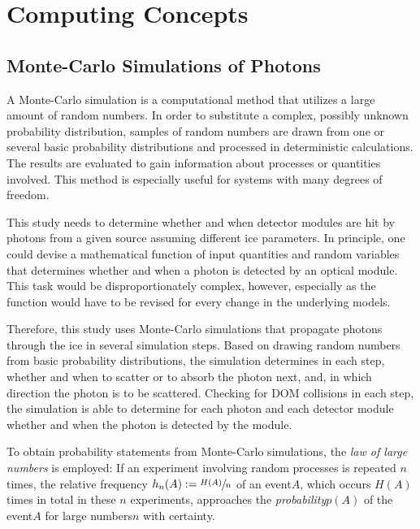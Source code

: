 \section{Computing Concepts}
\label{sec:simulation_background}

\subsection{Monte-Carlo Simulations of Photons}
\label{sec:monte_carlo}

A Monte-Carlo simulation is a computational method that utilizes a large
amount of random numbers. In order to substitute a complex, possibly
unknown probability distribution, samples of random numbers are drawn
from one or several basic probability distributions and processed in
deterministic calculations. The results are evaluated to gain
information about processes or quantities involved. This method is
especially useful for systems with many degrees of freedom.
\cite{physiklexikon}

This study needs to determine whether and when detector modules are hit
by photons from a given source assuming different ice parameters. In
principle, one could devise a mathematical function of input quantities
and random variables that determines whether and when a photon is
detected by an optical module. This task would be disproportionately
complex, however, especially as the function would have to be revised
for every change in the underlying models.

Therefore, this study uses Monte-Carlo simulations that propagate
photons through the ice in several simulation steps. Based on drawing
random numbers from basic probability distributions, the simulation
determines in each step, whether and when to scatter or to absorb the
photon next, and, in which direction the photon is to be scattered.
Checking for DOM collisions in each step, the simulation is able to
determine for each photon and each detector module whether and when the
photon is detected by the module.

To obtain probability statements from Monte-Carlo simulations, the
\textit{law of large numbers} is employed: If an experiment involving
random processes is repeated \(n\) times, the relative frequency
\(h_n(A):=\sfrac{H(A)}{n}\) of an event\nbsp \(A\), which occurs
\(H(A)\) times in total in these \(n\) experiments, approaches the
\textit{probability}\nbsp \(p(A)\) of the event\nbsp \(A\) for large
numbers\nbsp \(n\) with certainty. \cite{physiklexikon}

